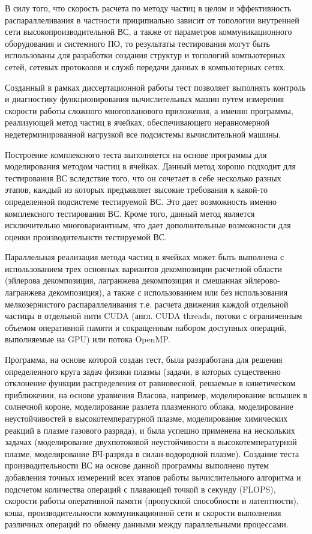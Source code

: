В силу того, что скорость расчета по методу частиц в целом и эффективность распараллеливания в частности приципиально зависит от топологии внутренней сети высокопроизводительной ВС, а также от параметров коммуникационного оборудования и системного ПО, то результаты тестирования могут быть использованы для разработки создания структур и топологий компьютерных сетей, сетевых протоколов и служб передачи данных в компьютерных сетях.

Созданный в рамках диссертационной работы тест позволяет выполнять контроль и диагностику функционирования вычислительных машин путем измерения скорости работы сложного многопланового приложения, а именно программы, реализующей метод частиц в ячейках, обеспечивающего неравномерной недетерминированной нагрузкой все подсистемы вычислительной машины.

{\methods} Построение комплексного теста выполняется на основе программы для моделирования методом частиц в ячейках. Данный метод хорошо подходит для тестирования ВС вследствие того, что он сочетает в себе несколько разных этапов, каждый из которых предъявляет высокие требования к какой-то определенной подсистеме тестируемой ВС. Это дает возможность именно комплексного тестирования ВС. Кроме того, данный метод является исключительно многовариантным, что дает дополнительные возможности  для оценки производительнсти тестируемой ВС.

Параллельная реализация метода частиц в ячейках может быть выполнена с использованием трех основных вариантов декомпозиции расчетной области (эйлерова декомпозиция, лагранжева декомпозиция и смешанная эйлерово-лагранжева декомпозиция), а также с использованием или без использования мелкозернистого распараллеливания т.е. расчета движения каждой отдельной частицы в отдельной нити CUDA (англ. CUDA threads, потоки с ограниченным объемом оперативной памяти и сокращенным набором доступных операций, выполняемые на GPU) или потока OpenMP. 

Программа, на основе которой создан тест, была раззработана для решения определенного круга задач физики плазмы (задачи, в которых существенно отклонение функции распределения от равновесной, решаемые в кинетическом приближении, на основе уравнения Власова, например, моделирование вспышек в солнечной короне, моделирование разлета плазменного облака, моделирование неустойчивостей в высокотемпературной плазме, моделирование химических реакций в плазме газового разряда), и была успешно применена на нескольких задачах (моделирование двухпотоковой неустойчивости в высокотемпературной плазме, моделирование ВЧ-разряда в силан-водородной плазме). Создание теста производительности ВС на основе данной программы выполнено путем добавления точных измерений всех этапов работы вычислительного алгоритма и подсчетом количества операций с плавающей точкой в секунду (FLOPS), скорости работы оперативной памяти (пропускной способности и латентности), кэша, производительности коммуникационной сети и скорости выполнения различных операций по обмену данными между параллельными процессами.

